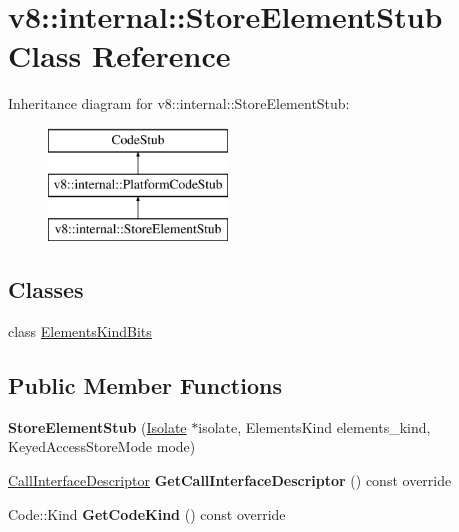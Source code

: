 \hypertarget{classv8_1_1internal_1_1_store_element_stub}{}\section{v8\+:\+:internal\+:\+:Store\+Element\+Stub Class Reference}
\label{classv8_1_1internal_1_1_store_element_stub}
Inheritance diagram for v8\+:\+:internal\+:\+:Store\+Element\+Stub\+:\begin{figure}[H]
\begin{center}
\leavevmode
\includegraphics[height=3.000000cm]{classv8_1_1internal_1_1_store_element_stub}
\end{center}
\end{figure}
\subsection*{Classes}
\begin{DoxyCompactItemize}
\item 
class \hyperlink{classv8_1_1internal_1_1_store_element_stub_1_1_elements_kind_bits}{Elements\+Kind\+Bits}
\end{DoxyCompactItemize}
\subsection*{Public Member Functions}
\begin{DoxyCompactItemize}
\item 
{\bfseries Store\+Element\+Stub} (\hyperlink{classv8_1_1internal_1_1_isolate}{Isolate} $\ast$isolate, Elements\+Kind elements\+\_\+kind, Keyed\+Access\+Store\+Mode mode)\hypertarget{classv8_1_1internal_1_1_store_element_stub_ae283a448be5ef64d416abaed9183d374}{}\label{classv8_1_1internal_1_1_store_element_stub_ae283a448be5ef64d416abaed9183d374}

\item 
\hyperlink{classv8_1_1internal_1_1_call_interface_descriptor}{Call\+Interface\+Descriptor} {\bfseries Get\+Call\+Interface\+Descriptor} () const  override\hypertarget{classv8_1_1internal_1_1_store_element_stub_a9c8b776e0ebea20047d8e3cd5a66fb5d}{}\label{classv8_1_1internal_1_1_store_element_stub_a9c8b776e0ebea20047d8e3cd5a66fb5d}

\item 
Code\+::\+Kind {\bfseries Get\+Code\+Kind} () const  override\hypertarget{classv8_1_1internal_1_1_store_element_stub_a31e9662bd36bb24d2b5cd5986cf3b10e}{}\label{classv8_1_1internal_1_1_store_element_stub_a31e9662bd36bb24d2b5cd5986cf3b10e}

\end{DoxyCompactItemize}
